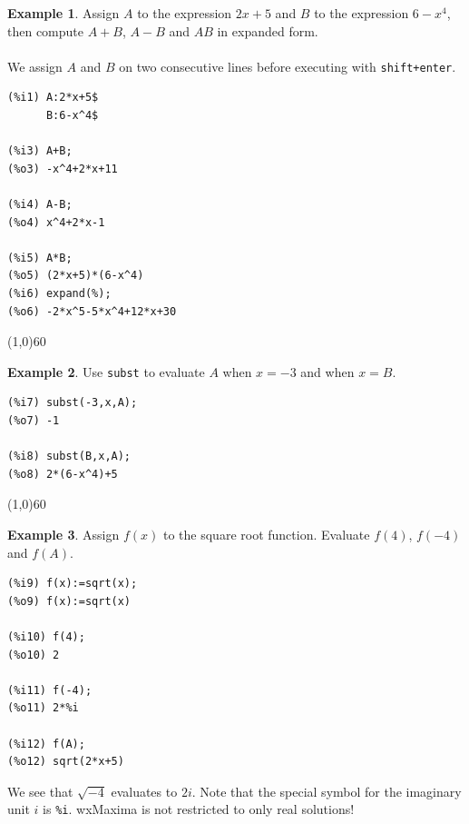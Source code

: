 \documentclass[10.5pt,twoside]{report}
\theoremstyle{definition}
\newtheorem{exmp}{Example}[section]
\begin{document}
\begin{exmp}  Assign $A$ to the expression $2x+5$ and $B$ to the expression $6-x^4$, then compute $A+B$, $A-B$ and $AB$ in expanded form.\\
${}$\\

We assign $A$ and $B$ on two consecutive lines before executing with \verb|shift+enter|.

\begin{verbatim}
(%i1) A:2*x+5$
      B:6-x^4$

(%i3) A+B;
(%o3) -x^4+2*x+11

(%i4) A-B;
(%o4) x^4+2*x-1

(%i5) A*B;
(%o5) (2*x+5)*(6-x^4)
(%i6) expand(%);
(%o6) -2*x^5-5*x^4+12*x+30
\end{verbatim}

\end{exmp}

\line(1,0){60}
\linethickness{0.5mm}

\begin{exmp}  Use \verb|subst| to evaluate $A$ when $x=-3$ and when $x=B$.\\


\begin{verbatim}
(%i7) subst(-3,x,A);
(%o7) -1

(%i8) subst(B,x,A);
(%o8) 2*(6-x^4)+5
\end{verbatim}

\end{exmp}

\line(1,0){60}
\linethickness{0.5mm}
${}$\\

\begin{exmp}  Assign $f(x)$ to the square root function.  Evaluate $f(4)$, $f(-4)$ and $f(A)$.\\


\begin{verbatim}
(%i9) f(x):=sqrt(x);
(%o9) f(x):=sqrt(x)

(%i10) f(4);
(%o10) 2

(%i11) f(-4);
(%o11) 2*%i

(%i12) f(A);
(%o12) sqrt(2*x+5)
\end{verbatim}

We see that $\sqrt{-4}$ evaluates to $2i$.  Note that the special symbol for the imaginary unit $i$ is \verb|%i|.  wxMaxima is not restricted to only real solutions!

\end{exmp}
\end{document}
